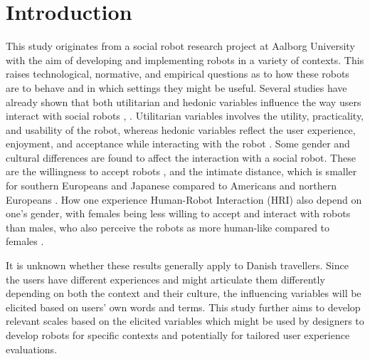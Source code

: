 \section{Introduction}
\label{Introduction}
%
This study originates from a social robot research project at Aalborg University with the aim of developing and implementing robots in a variety of contexts. This raises technological, normative, and empirical questions as to how these robots are to behave and in which settings they might be useful. Several studies have already shown that both utilitarian and hedonic variables influence the way users interact with social robots \cite{PDF:ExploringInfluencingVariable}, \cite{PDF:SharingALifeHarvey}. Utilitarian variables involves the utility, practicality, and usability of the robot, whereas hedonic variables reflect the user experience, enjoyment, and acceptance while interacting with the robot \cite{PDF:ExploringInfluencingVariable}. Some gender and cultural differences are found to affect the interaction with a social robot. These are the willingness to accept robots \cite{PDF:InTheCompanyofRobots}, and the intimate distance, which is smaller for southern Europeans and Japanese compared to Americans and northern Europeans \cite{PDF:HowMayIServeYou}. How one experience Human-Robot Interaction (HRI) also depend on one's gender, with females being less willing to accept and interact with robots than males, who also perceive the robots as more human-like compared to females \cite{PDF:ExploringInfluencingVariable}.

It is unknown whether these results generally apply to Danish travellers. Since the users have different experiences and might articulate them differently depending on both the context and their culture, the influencing variables will be elicited based on users' own words and terms. This study further aims to develop relevant scales based on the elicited variables which might be used by designers to develop robots for specific contexts and potentially for tailored user experience evaluations.





